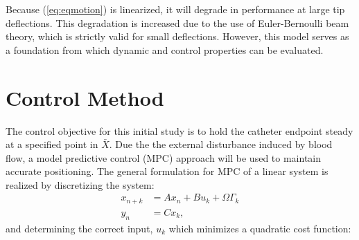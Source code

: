 \documentclass[letterpaper,10pt,conference]{ieeeconf}   %
\begin{document}
Because (\ref{eq:eqmotion}) is linearized, it will degrade in performance at large tip deflections. This degradation is increased due to the use of Euler-Bernoulli beam theory, which is strictly valid for small deflections. However, this model serves as a foundation from which dynamic and control properties can be evaluated.

\section{Control Method}
\label{sec:control}

The control objective for this initial study is to hold the catheter endpoint steady at a specified point in $\bar{X}$. Due the the external disturbance induced by blood flow, a model predictive control (MPC) approach will be used to maintain accurate positioning. The general formulation for MPC of a linear system is realized by discretizing the system:
%
\begin{equation}
\begin{align}
\label{eq:discrete-ss}
x_{n+k} &= A x_n + B u_k + \Omega \Gamma_k\\
y_n &= C x_k,
\end{align}
\end{equation}
%
and determining the correct input, $u_k$ which minimizes a quadratic cost function:
%
\begin{equation}

\end{equation}




\end{document}
